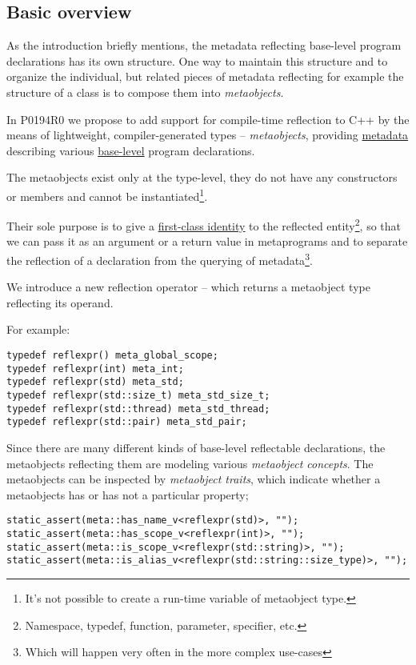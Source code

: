 \subsection{Basic overview}

As the introduction briefly mentions, the metadata reflecting base-level
program declarations has its own structure. One way to maintain this structure
and to organize the individual, but related pieces of metadata reflecting
for example the structure of a class is to compose them into {\em metaobjects}.

In P0194R0 we propose to add support for
compile-time reflection to C++ by the means of lightweight, compiler-generated
types -- {\em metaobjects}, providing \hyperref[term-metadata]{metadata}
describing various \hyperref[term-base-meta-level]{base-level} program declarations.

The metaobjects exist only at the type-level, they do not have any constructors
or members and cannot be instantiated\footnote{It's not possible to create
a run-time variable of metaobject type.}.

Their sole purpose is to give a \hyperref[term-first-class]{first-class identity}
to the reflected entity\footnote{Namespace, typedef, function, parameter, specifier, etc.},
so that we can pass it as an argument or a return value in metaprograms and to
separate the reflection of a declaration from the querying of metadata\footnote
{Which will happen very often in the more complex use-cases}.

We introduce a new reflection operator -- \verb@reflexpr@ which returns a
metaobject type reflecting its operand.

For example:

\begin{verbatim}
typedef reflexpr() meta_global_scope;
typedef reflexpr(int) meta_int;
typedef reflexpr(std) meta_std;
typedef reflexpr(std::size_t) meta_std_size_t;
typedef reflexpr(std::thread) meta_std_thread;
typedef reflexpr(std::pair) meta_std_pair;
\end{verbatim}

Since there are many different kinds of
base-level reflectable declarations, the metaobjects reflecting them are
modeling various {\em metaobject concepts}. The metaobjects can be inspected
by {\em metaobject traits}, which indicate whether a metaobjects has or has
not a particular property;

\begin{verbatim}
static_assert(meta::has_name_v<reflexpr(std)>, "");
static_assert(meta::has_scope_v<reflexpr(int)>, "");
static_assert(meta::is_scope_v<reflexpr(std::string)>, "");
static_assert(meta::is_alias_v<reflexpr(std::string::size_type)>, "");
\end{verbatim}

